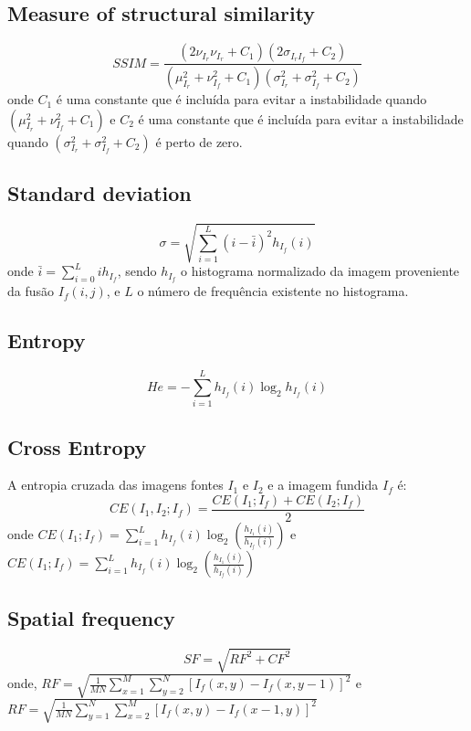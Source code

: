 \subsection{Measure of structural similarity}
\begin{equation}
SSIM=\frac{(2\nu_{I_r}\nu_{I_r}+C_1)(2\sigma_{I_rI_f}+C_2)}{(\mu_{I_r}^2+\nu_{I_f}^2+C_1)(\sigma_{I_r}^2+\sigma_{I_f}^2+C_2)}
\end{equation}
onde $C_1$ é uma constante que é incluída para evitar a instabilidade quando $(\mu_{I_r}^2+\nu_{I_f}^2+C_1)$ e $C_2$ é uma constante que é incluída para evitar a instabilidade quando $(\sigma_{I_r}^2+\sigma_{I_f}^2+C_2)$ é perto de zero.
\subsection{Standard deviation}
\begin{equation}
\sigma=\sqrt{\sum_{i=1}^L(i-\bar{i})^2h_{I_f}(i)}
\end{equation}
onde $\bar{i}=\sum_{i=0}^Lih_{I_f}$, sendo $h_{I_f}$ o histograma normalizado da imagem proveniente da fusão $I_f(i,j)$, e $L$ o número de frequência existente no histograma.
\subsection{Entropy}
\begin{equation}
He=-\sum_{i=1}^Lh_{I_f}(i)\log_2 h_{I_f}(i)
\end{equation}
\subsection{Cross Entropy}
A entropia cruzada das imagens fontes $I_1$ e $I_2$ e a imagem fundida $I_f$ é:
\begin{equation}
CE(I_1,I_2;I_f)=\frac{CE(I_1;I_f)+CE(I_2;I_f)}{2}
\end{equation}
onde $CE(I_1;I_f)=\sum_{i=1}^Lh_{I_f}(i)\log_2\left( \frac{h_{I_1}(i)}{h_{I_f}(i)}\right)$ e $CE(I_1;I_f)=\sum_{i=1}^Lh_{I_f}(i)\log_2\left( \frac{h_{I_1}(i)}{h_{I_f}(i)}\right)$
\subsection{Spatial frequency}
\begin{equation}
SF=\sqrt{RF^2+CF^2}
\end{equation}
onde, $RF=\sqrt{\frac{1}{MN}\sum_{x=1}^M\sum_{y=2}^N[I_f(x,y)-I_f(x,y-1)]^2}$ e $RF=\sqrt{\frac{1}{MN}\sum_{y=1}^N\sum_{x=2}^M[I_f(x,y)-I_f(x-1,y)]^2}$
